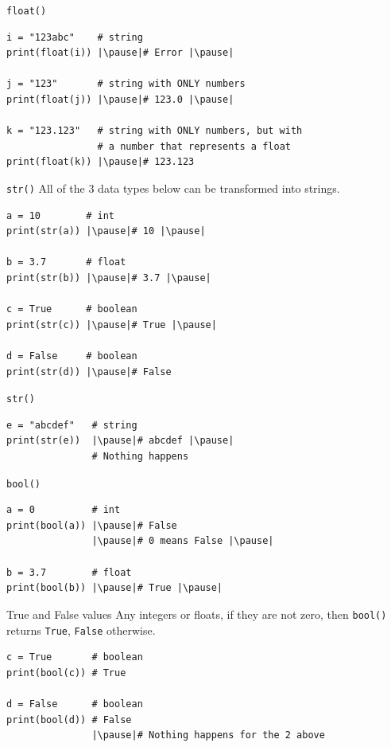 \documentclass[dvipsnames, svgnames, x11names]{beamer}
\begin{document}
\begin{frame}[fragile]{\texttt{float()}}
\begin{verbatim}
i = "123abc"    # string
print(float(i)) |\pause|# Error |\pause|
 
j = "123"       # string with ONLY numbers
print(float(j)) |\pause|# 123.0 |\pause|

k = "123.123"   # string with ONLY numbers, but with 
                # a number that represents a float
print(float(k)) |\pause|# 123.123
\end{verbatim}
\end{frame}

\begin{frame}[fragile]{\texttt{str()}}
All of the 3 data types below can be transformed into strings. \pause
\begin{verbatim} 
a = 10        # int
print(str(a)) |\pause|# 10 |\pause|

b = 3.7       # float
print(str(b)) |\pause|# 3.7 |\pause|

c = True      # boolean
print(str(c)) |\pause|# True |\pause|

d = False     # boolean
print(str(d)) |\pause|# False
\end{verbatim}
\end{frame}

\begin{frame}[fragile]{\texttt{str()}}
\begin{verbatim} 
e = "abcdef"   # string
print(str(e))  |\pause|# abcdef |\pause|
               # Nothing happens
\end{verbatim}
\end{frame}

\begin{frame}[fragile]{\texttt{bool()}}
\begin{verbatim} 
a = 0          # int
print(bool(a)) |\pause|# False
               |\pause|# 0 means False |\pause|

b = 3.7        # float
print(bool(b)) |\pause|# True |\pause|
\end{verbatim}

\begin{block}{True and False values}
	Any integers or floats, if they are not zero, then \texttt{bool()} returns \texttt{True}, \texttt{False} otherwise.
\end{block}

\pause

\begin{verbatim} 
c = True       # boolean
print(bool(c)) # True

d = False      # boolean
print(bool(d)) # False
               |\pause|# Nothing happens for the 2 above
\end{verbatim}
\end{frame}
\end{document}
